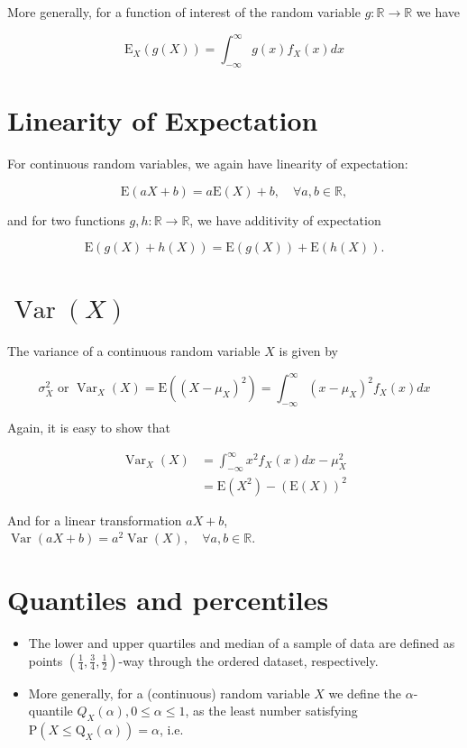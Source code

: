 \documentclass[10pt]{article}
\begin{document}
More generally, for a function of interest of the random variable $g: \mathbb{R} \rightarrow \mathbb{R}$ we have

$$
\mathrm{E}_{X}(g(X))=\int_{-\infty}^{\infty} g(x) f_{X}(x) d x
$$

\section*{Linearity of Expectation}
For continuous random variables, we again have linearity of expectation:

$$
\mathrm{E}(a X+b)=a \mathrm{E}(X)+b, \quad \forall a, b \in \mathbb{R},
$$

and for two functions $g, h: \mathbb{R} \rightarrow \mathbb{R}$, we have additivity of expectation

$$
\mathrm{E}(g(X)+h(X))=\mathrm{E}(g(X))+\mathrm{E}(h(X)) .
$$

\section*{$\operatorname{Var}(X)$}
The variance of a continuous random variable $X$ is given by

$$
\sigma_{X}^{2} \text { or } \operatorname{Var}_{X}(X)=\mathrm{E}\left(\left(X-\mu_{X}\right)^{2}\right)=\int_{-\infty}^{\infty}\left(x-\mu_{X}\right)^{2} f_{X}(x) d x
$$

Again, it is easy to show that

$$
\begin{aligned}
\operatorname{Var}_{X}(X) & =\int_{-\infty}^{\infty} x^{2} f_{X}(x) d x-\mu_{X}^{2} \\
& =\mathrm{E}\left(X^{2}\right)-(\mathrm{E}(X))^{2}
\end{aligned}
$$

And for a linear transformation $a X+b$,\\
$\operatorname{Var}(a X+b)=a^{2} \operatorname{Var}(X), \quad \forall a, b \in \mathbb{R}$.

\section*{Quantiles and percentiles}
\begin{itemize}
  \item The lower and upper quartiles and median of a sample of data are defined as points $\left(\frac{1}{4}, \frac{3}{4}, \frac{1}{2}\right)$-way through the ordered dataset, respectively.
  \item More generally, for a (continuous) random variable $X$ we define the $\alpha$-quantile $Q_{X}(\alpha), 0 \leq \alpha \leq 1$, as the least number satisfying $\mathrm{P}\left(X \leq \mathrm{Q}_{X}(\alpha)\right)=\alpha$, i.e.
\end{itemize}
\end{document}
